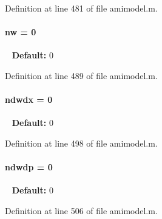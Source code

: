 Definition at line 481 of file amimodel.\+m.

\hypertarget{classamimodel_a371815f74d602ff1338376abbd1278e4}{}
\paragraph[{nw}]{\setlength{\rightskip}{0pt plus 5cm}nw = 0}\label{classamimodel_a371815f74d602ff1338376abbd1278e4}
~\newline
{\bfseries Default\+:} 0 

Definition at line 489 of file amimodel.\+m.

\hypertarget{classamimodel_ae6c1afb5529f1cc0ff56552f94e7a2b5}{}
\paragraph[{ndwdx}]{\setlength{\rightskip}{0pt plus 5cm}ndwdx = 0}\label{classamimodel_ae6c1afb5529f1cc0ff56552f94e7a2b5}
~\newline
{\bfseries Default\+:} 0 

Definition at line 498 of file amimodel.\+m.

\hypertarget{classamimodel_aa8af9048cd0280059bed9ef8999ecffb}{}
\paragraph[{ndwdp}]{\setlength{\rightskip}{0pt plus 5cm}ndwdp = 0}\label{classamimodel_aa8af9048cd0280059bed9ef8999ecffb}
~\newline
{\bfseries Default\+:} 0 

Definition at line 506 of file amimodel.\+m.

